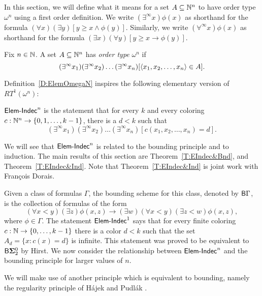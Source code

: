 In this section, we will define what it means for a set $A\subseteq\mathbb{N}^n$
to have order type $\omega^n$ using a first order definition.
We write $(\exists^\infty x)\phi(x)$ as shorthand for the formula
$(\forall x)(\exists y)[y\geq x\land\phi(y)]$.
Similarly, we write $(\forall^\infty x)\phi(x)$ as shorthand for the formula
$(\exists x)(\forall y)[y\geq x\rightarrow \phi(y)]$.

\begin{definition}\label{D:ElemOmegaN}
Fix $n\in\mathbb{N}$.  A set $A\subseteq\mathbb{N}^n$ has \textit{order type} $\omega^n$ if
$$(\exists^\infty x_1)(\exists^\infty x_2)\ldots(\exists^\infty x_n)[\left\langle x_1,x_2,\ldots,x_n\right\rangle\in A].$$
\end{definition}

Definition~\ref{D:ElemOmegaN} inspires the following elementary version of $RT^1(\omega^n)$:

\begin{definition}\label{D:ElemIndec}
$\mathsf{Elem{\mbox{-}}Indec}^n$ is the statement that for every $k$ and every coloring
$c:\mathbb{N}^n\to\{0,1,\ldots,k-1\}$, there is a $d<k$ such that
$$(\exists^\infty x_1)(\exists^\infty x_2)\ldots(\exists^\infty x_n)[c(x_1,x_2,\ldots,x_n)=d].$$
\end{definition}

We will see that $\mathsf{Elem{\mbox{-}}Indec}^n$ is related to the bounding
principle and to induction.
The main results of this section are Theorem~\ref{T:EIndec&Bnd},
and Theorem~\ref{T:EIndec&Ind}.
Note that Theorem~\ref{T:EIndec&Ind} is joint work with Fran\c{c}ois Dorais.

Given a class of formulas $\Gamma$, the bounding scheme for
this class, denoted by $\mathsf{B}{\Gamma}$, is the collection of formulas
of the form
\begin{equation*}
  (\forall x<y)(\exists z)\phi(x,z) \rightarrow (\exists w)(\forall
  x<y)(\exists z<w)\phi(x,z),
\end{equation*}
where $\phi\in\Gamma$.
The statement $\mathsf{Elem{\mbox{-}}Indec}^1$ says that for every
finite coloring $c:\mathbb{N}\to\{0,\dots,k-1\}$ there is a color $d < k$
such that the set $A_d = \{x: c(x) = d\}$ is infinite.
This statement was proved to be equivalent to $\mathsf{B}{\mathbf{\Sigma}^0_2}$ by Hirst.  \cite{Hirst:thesis}
We now consider the relationship between $\mathsf{Elem{\mbox{-}}Indec}^n$ and
the bounding principle for larger values of $n$.

We will make use of another principle which is equivalent to bounding,
namely the regularity principle
of H{\'a}jek and Pudl{\'a}k  \cite{Hajek&Pudlak}.

